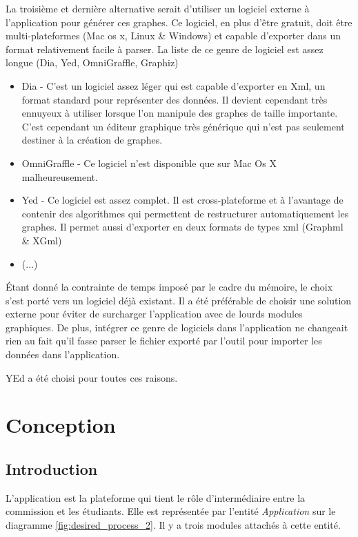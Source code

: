 La troisième et dernière alternative serait d'utiliser un logiciel externe à l'application pour générer ces graphes. Ce logiciel, en plus d'être gratuit, doit être multi-plateformes (Mac os x, Linux \& Windows) et capable d'exporter dans un format relativement facile à parser. La liste de ce genre de logiciel est assez longue (Dia, Yed, OmniGraffle, Graphiz)
\begin{itemize}
  \item Dia - C'est un logiciel assez léger qui est capable d'exporter en Xml, un format standard pour représenter des données. Il devient cependant très ennuyeux à utiliser lorsque l'on manipule des graphes de taille importante. C'est cependant un éditeur graphique très générique qui n'est pas seulement destiner à la création de graphes. 
  \item OmniGraffle - Ce logiciel n'est disponible que sur Mac Os X malheureusement.
  \item Yed - Ce logiciel est assez complet. Il est cross-plateforme et à l'avantage de contenir des algorithmes qui permettent de restructurer automatiquement les graphes. Il permet aussi d'exporter en deux formats de types xml (Graphml \& XGml)
  \item (...)
\end{itemize}

Étant donné la contrainte de temps imposé par le cadre du mémoire, le choix s'est porté vers un logiciel déjà existant. Il a été préférable de choisir une solution externe pour éviter de surcharger l'application avec de lourds modules graphiques. De plus, intégrer ce genre de logiciels dans l'application ne changeait rien au fait qu'il fasse parser le fichier exporté par l'outil pour importer les données dans l'application.

YEd a été choisi pour toutes ces raisons. 
\clearpage
\section{Conception}
\subsection{Introduction}
 
L'application est la  plateforme qui tient le rôle d'intermédiaire entre la commission et les étudiants. Elle est représentée par l'entité \textit{Application} sur le diagramme \ref{fig:desired_process_2}. Il y a trois modules attachés à cette entité.

